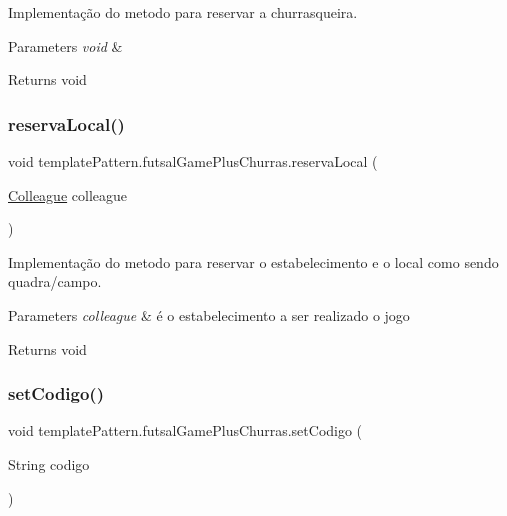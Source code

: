 Implementação do metodo para reservar a churrasqueira. 


\begin{DoxyParams}{Parameters}
{\em void} & \\
\hline
\end{DoxyParams}
\begin{DoxyReturn}{Returns}
void 
\end{DoxyReturn}
\mbox{\label{classtemplate_pattern_1_1futsal_game_plus_churras_a4c2d8873dff90fb25d1b57d08faedad6}} 
\subsubsection{\texorpdfstring{reservaLocal()}{reservaLocal()}}
{\footnotesize\ttfamily void template\+Pattern.\+futsal\+Game\+Plus\+Churras.\+reserva\+Local (\begin{DoxyParamCaption}\item[{\mbox{\hyperlink{classmediator_pattern_1_1_colleague}{Colleague}}}]{colleague }\end{DoxyParamCaption})}



Implementação do metodo para reservar o estabelecimento e o local como sendo quadra/campo. 


\begin{DoxyParams}{Parameters}
{\em colleague} & é o estabelecimento a ser realizado o jogo \\
\hline
\end{DoxyParams}
\begin{DoxyReturn}{Returns}
void 
\end{DoxyReturn}
\mbox{\label{classtemplate_pattern_1_1futsal_game_plus_churras_a630d4300755bd9379d5accc6cc56f93f}} 
\subsubsection{\texorpdfstring{setCodigo()}{setCodigo()}}
{\footnotesize\ttfamily void template\+Pattern.\+futsal\+Game\+Plus\+Churras.\+set\+Codigo (\begin{DoxyParamCaption}\item[{String}]{codigo }\end{DoxyParamCaption})}



